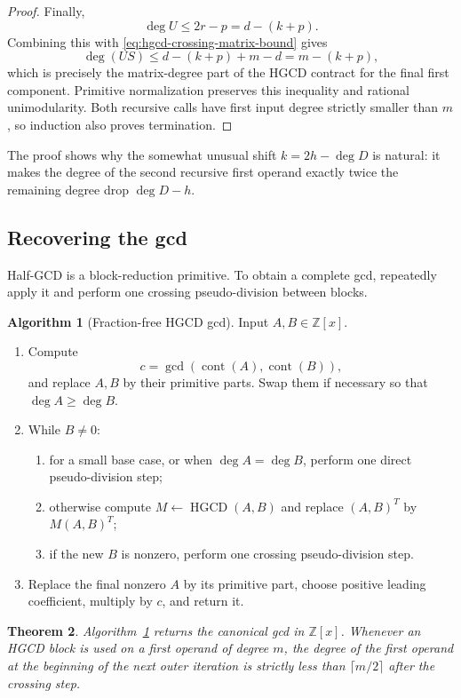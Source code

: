 \documentclass[11pt]{book}
\newtheorem{theorem}{Theorem}[section]
\theoremstyle{definition}
\newtheorem{algorithm}[theorem]{Algorithm}
\newcommand{\ZZ}{\mathbb Z}
\begin{document}
\begin{proof}
Finally,
\[
 \deg U\le2r-p=d-(k+p).
\]
Combining this with \eqref{eq:hgcd-crossing-matrix-bound} gives
\[
 \deg(US)
 \le d-(k+p)+m-d
 =m-(k+p),
\]
which is precisely the matrix-degree part of the HGCD contract for the final
first component.  Primitive normalization preserves this inequality and
rational unimodularity.  Both recursive calls have first input degree strictly
smaller than $m$, so induction also proves termination.
\end{proof}

The proof shows why the somewhat unusual shift
$k=2h-\deg D$ is natural: it makes the degree of the second recursive first
operand exactly twice the remaining degree drop $\deg D-h$.

\subsection{Recovering the gcd}

Half-GCD is a block-reduction primitive.  To obtain a complete gcd, repeatedly
apply it and perform one crossing pseudo-division between blocks.

\begin{algorithm}[Fraction-free HGCD gcd]\label{alg:gcd-hgcd}
Input $A,B\in\ZZ[x]$.
\begin{enumerate}
 \item Compute
 \[
  c=\gcd(\operatorname{cont}(A),\operatorname{cont}(B)),
 \]
 and replace $A,B$ by their primitive parts.  Swap them if necessary so that
 $\deg A\ge\deg B$.
 \item While $B\ne0$:
 \begin{enumerate}
  \item for a small base case, or when $\deg A=\deg B$, perform one direct
  pseudo-division step;
  \item otherwise compute $M\leftarrow\operatorname{HGCD}(A,B)$ and replace
  $(A,B)^T$ by $M(A,B)^T$;
  \item if the new $B$ is nonzero, perform one crossing pseudo-division step.
 \end{enumerate}
 \item Replace the final nonzero $A$ by its primitive part, choose positive
 leading coefficient, multiply by $c$, and return it.
\end{enumerate}
\end{algorithm}

\begin{theorem}\label{thm:gcd-hgcd-correctness}
Algorithm~\ref{alg:gcd-hgcd} returns the canonical gcd in $\ZZ[x]$.
Whenever an HGCD block is used on a first operand of degree $m$, the degree of
the first operand at the beginning of the next outer iteration is strictly
less than $\lceil m/2\rceil$ after the crossing step.
\end{theorem}
\end{document}
